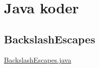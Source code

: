 \chapter{Java koder}

\section{BackslashEscapes}
\label{BackslashEscapes}

\underline{BackslashEscapes.java}
\begin{lstlisting}[language=Java]

\end{lstlisting}